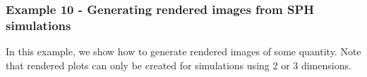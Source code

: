 \documentclass[a4paper]{article}
\newcommand{\var}[1]{\texttt{#1}}
\begin{document}






\subsubsection{Example  10 - Generating rendered images from SPH simulations}
In this example, we show how to generate rendered images of some quantity.  Note that rendered plots can only be created for simulations using 2 or 3 dimensions. \\

\end{document}
